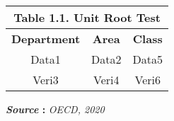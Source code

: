 \documentclass[10pt,a4paper]{article}
\begin{document}
	
\renewcommand{\tablename}{\textbf{Table}}

\onehalfspacing


\begin{center}
	
	\begin{tabular}{|c|c|c|}
		
		\multicolumn{3}{c}{\textbf{Table 1.1. Unit Root Test}} \\[1ex]
		
		
		\hline
		\textbf{Department} & \textbf{Area} & \textbf{Class} \\ \cline{1-3}
		\hline
		Data1 & Data2 & Data5 \\
		\hline
		Veri3 & Veri4 & Veri6 \\ \hline
	\end{tabular}
	
	\vspace{0.15cm}
	
	\textbf{\textit{Source} :} \textit{OECD, 2020}
	
	
\end{center}

\lipsum[1]
\end{document}
